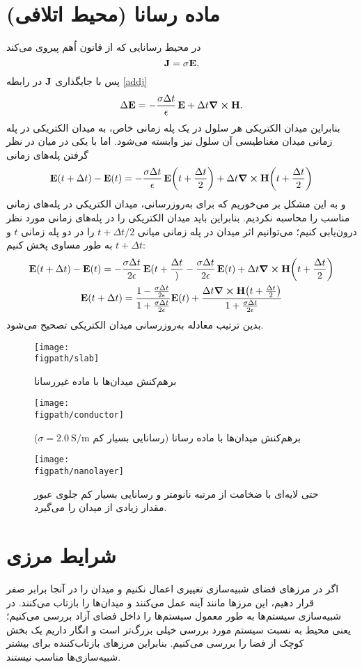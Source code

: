 \documentclass[12pt,a4paper]{article}
\newcommand{\figpath}{../figures}
\newcommand{\figwidth}{0.9\linewidth}
\begin{document}
	\section{ماده رسانا (محیط اتلافی)}
	در محیط رسانایی که از قانون اُهم پیروی می‌کند
	\begin{equation}
		\vb{J} = \sigma \vb{E},
	\end{equation}
	پس با جایگذاری $\vb{J}$ در رابطه \eqref{addj} 
	\begin{equation}
		\Delta{\vb{E}}=-\frac{\sigma\Delta{t}}{\epsilon}\,\vb{E}+\Delta{t}\curl{\vb{H}}.
	\end{equation}
	بنابراین میدان الکتریکی هر سلول در یک پله زمانی خاص، به میدان الکتریکی در پله زمانی میدان مغناطیسی آن سلول نیز وابسته می‌شود.
	اما با یکی در میان در نظر گرفتن پله‌های زمانی
	\begin{equation}
		\vb{E}(t + \Delta{t}) - \vb{E}(t) = -\frac{\sigma\Delta{t}}{\epsilon}\,\vb{E}\qty(t+\frac{\Delta{t}}{2})+\Delta{t}\curl{\vb{H}}\qty(t+\frac{\Delta{t}}{2})
	\end{equation}
	و به این مشکل بر می‌خوریم که برای به‌روزرسانی، میدان الکتریکی در پله‌های زمانی مناسب را محاسبه نکردیم.
	بنابراین باید میدان الکتریکی را در پله‌های زمانی مورد نظر درون‌یابی کنیم؛
	می‌توانیم اثر میدان در پله زمانی میانی $t + \Delta{t}/2 $ را در دو پله زمانی $t$ و $t+\Delta{t}$ به طور مساوی پخش کنیم:
	\begin{gather}
		\vb{E}(t + \Delta{t}) - \vb{E}(t) = -\frac{\sigma\Delta{t}}{2\epsilon}\,\vb{E}(t+\frac{\Delta{t}})
		-\frac{\sigma\Delta{t}}{2\epsilon}\,\vb{E}(t) + \Delta{t}\curl{\vb{H}}\qty(t+\frac{\Delta{t}}{2}) \\
		\vb{E}(t + \Delta{t}) = \frac{1-\frac{\sigma\Delta{t}}{2\epsilon}}{1+\frac{\sigma\Delta{t}}{2\epsilon}}\vb{E}(t)
		+ \frac{\Delta{t}\curl{\vb{H}}\qty(t+\frac{\Delta{t}}{2})}{1 + \frac{\sigma\Delta{t}}{2\epsilon}}
	\end{gather}
	بدین ترتیب معادله به‌روزرسانی میدان الکتریکی تصحیح می‌شود.
	\begin{figure}
		\centering
		\texttt{[image: \\figpath/slab]}
		\caption{برهم‌کنش میدان‌ها با ماده غیررسانا}
		\texttt{[image: \\figpath/conductor]}
		\caption{برهم‌کنش میدان‌ها با ماده رسانا (رسانایی بسیار کم $\sigma=\SI{2.0}{\siemens\per\meter}$)}
	\end{figure}
	\begin{figure}
		\centering
		\texttt{[image: \\figpath/nanolayer]}
		\caption{حتی لایه‌ای با ضخامت از مرتبه نانومتر و رسانایی بسیار کم جلوی عبور مقدار زیادی از میدان را می‌گیرد.}
	\end{figure}
	\FloatBarrier\section{شرایط مرزی}
	اگر در مرزهای فضای شبیه‌سازی تغییری اعمال نکنیم و میدان را در آنجا برابر صفر قرار دهیم، این مرزها مانند آینه عمل می‌کنند
	و میدان‌ها را بازتاب می‌کنند. در شبیه‌سازی سیستم‌ها به طور معمول سیستم‌ها را داخل فضای آزاد بررسی می‌کنیم؛
	یعنی محیط به نسبت سیستم مورد بررسی خیلی بزرگ‌تر است و انگار داریم یک بخش کوچک از فضا را بررسی می‌کنیم.
	بنابراین مرزهای بازتاب‌کننده برای بیشتر شبیه‌سازی‌ها مناسب نیستند.
	
\end{document}
